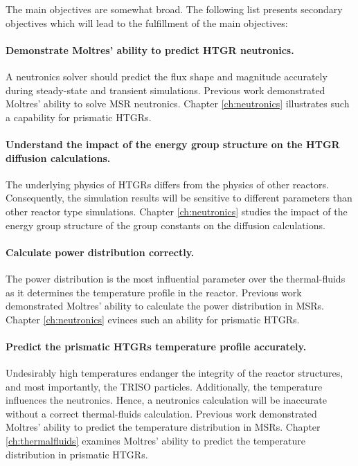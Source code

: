 \vskip 0.6cm
The main objectives are somewhat broad.
The following list presents secondary objectives which will lead to the fulfillment of the main objectives:

\paragraph{Demonstrate Moltres' ability to predict HTGR neutronics.}
A neutronics solver should predict the flux shape and magnitude accurately during steady-state and transient simulations.
Previous work demonstrated Moltres' ability to solve MSR neutronics.
Chapter \ref{ch:neutronics} illustrates such a capability for prismatic HTGRs.

\paragraph{Understand the impact of the energy group structure on the HTGR diffusion calculations.}
The underlying physics of \glspl{HTGR} differs from the physics of other reactors.
Consequently, the simulation results will be sensitive to different parameters than other reactor type simulations.
Chapter \ref{ch:neutronics} studies the impact of the energy group structure of the group constants on the diffusion calculations.

\paragraph{Calculate power distribution correctly.}
The power distribution is the most influential parameter over the thermal-fluids as it determines the temperature profile in the reactor.
Previous work demonstrated Moltres' ability to calculate the power distribution in MSRs.
Chapter \ref{ch:neutronics} evinces such an ability for prismatic HTGRs.

\paragraph{Predict the prismatic HTGRs temperature profile accurately.}
Undesirably high temperatures endanger the integrity of the reactor structures, and most importantly, the TRISO particles.
Additionally, the temperature influences the neutronics.
Hence, a neutronics calculation will be inaccurate without a correct thermal-fluids calculation. 
Previous work demonstrated Moltres' ability to predict the temperature distribution in MSRs.
Chapter \ref{ch:thermalfluids} examines Moltres' ability to predict the temperature distribution in prismatic HTGRs.

